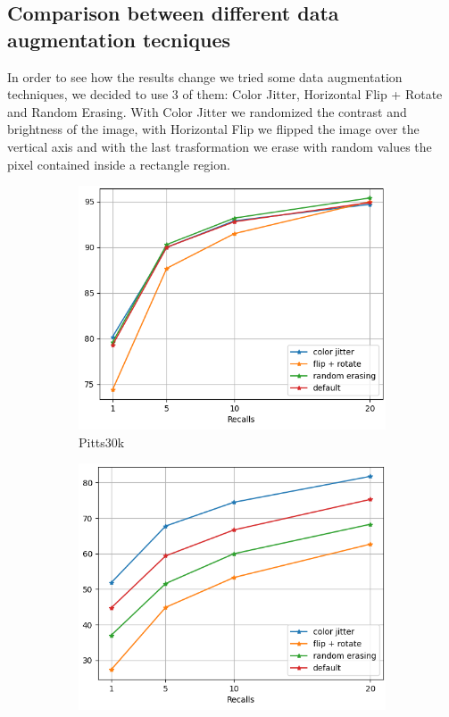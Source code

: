 \documentclass[10pt,twocolumn,letterpaper]{article}
\begin{document}
\subsection{Comparison between different data augmentation tecniques}
In order to see how the results change we tried some data augmentation techniques, we decided to use 3 of them: Color Jitter, Horizontal Flip + Rotate and Random Erasing. With Color Jitter we randomized the contrast and brightness of the image, with Horizontal Flip we flipped the image over the vertical axis and with the last trasformation we erase with random values the pixel contained inside a rectangle region.\\
\begin{figure}[!h]
	\centering
	\begin{subfigure}[b]{0.23\textwidth}
		\centering
		\includegraphics[width=\textwidth]{img/augment/test_pitts30k_recalls_graph.png}
		\caption{Pitts30k}
		\label{fig:recalls:augment:pitts30k}
	\end{subfigure}
	\hfill
	\begin{subfigure}[b]{0.23\textwidth}
		\centering
		\includegraphics[width=\textwidth]{img/augment/test_st_lucia_recalls_graph.png}

\end{subfigure}
\end{figure}
\end{document}
